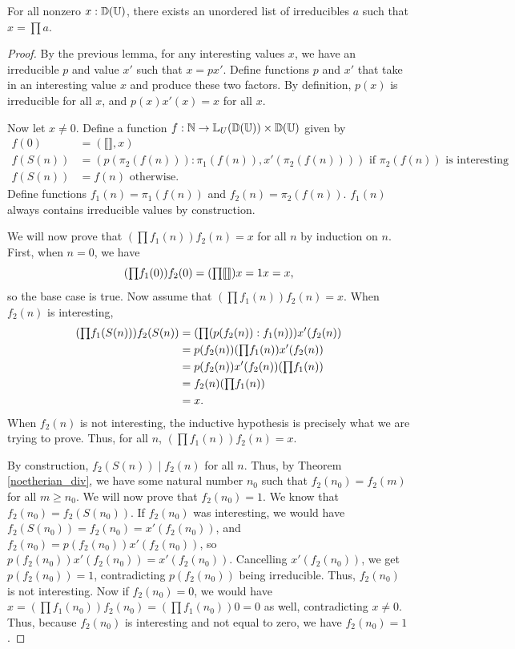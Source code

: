 \documentclass[../../math.tex]{subfiles}
\begin{document}
\begin{theorem} \label{noetherian_factors}
    For all nonzero $x : \mathbb{D}(\mathbb{U})$, there exists an unordered list of irreducibles
    $a$ such that $x = \prod a$.
\end{theorem}
\begin{proof}
    By the previous lemma, for any interesting values $x$, we have an
    irreducible $p$ and value $x'$ such that $x = px'$.  Define functions $p$
    and $x'$ that take in an interesting value $x$ and produce these two
    factors.  By definition, $p(x)$ is irreducible for all $x$, and $p(x)x'(x) =
    x$ for all $x$.

    Now let $x \neq 0$.  Define a function $f : \mathbb{N} \to \mathbb{L}_U(\mathbb{D}(\mathbb{U})) \times
    \mathbb{D}(\mathbb{U})$ given by
    \begin{align*}
        f(0) &= (\llbracket \rrbracket, x) \\
        f(S(n)) &= (p(\pi_2(f(n))) : \pi_1(f(n)), x'(\pi_2(f(n))))
            \text{ if $\pi_2(f(n))$ is interesting} \\
        f(S(n)) &= f(n) \text{ otherwise.}
    \end{align*}
    Define functions $f_1(n) = \pi_1(f(n))$ and $f_2(n) = \pi_2(f(n))$.
    $f_1(n)$ always contains irreducible values by construction.

    We will now prove that $(\prod f_1(n)) f_2(n) = x$ for all $n$ by induction
    on $n$.  First, when $n = 0$, we have
    \[
        ({\textstyle \prod} f_1(0)) f_2(0) = ({\textstyle \prod} \llbracket \rrbracket) x = 1x = x,
    \]
    so the base case is true.  Now assume that $(\prod f_1(n)) f_2(n) = x$.
    When $f_2(n)$ is interesting,
    \begin{align*}
        ({\textstyle \prod} f_1(S(n))) f_2(S(n))
        &= ({\textstyle \prod} (p(f_2(n)) : f_1(n))) x'(f_2(n)) \\
        &= p(f_2(n)) ({\textstyle \prod} f_1(n)) x'(f_2(n)) \\
        &= p(f_2(n)) x'(f_2(n)) ({\textstyle \prod} f_1(n)) \\
        &= f_2(n) ({\textstyle \prod} f_1(n)) \\
        &= x.
    \end{align*}
    When $f_2(n)$ is not interesting, the inductive hypothesis is precisely what
    we are trying to prove.  Thus, for all $n$, $(\prod f_1(n)) f_2(n) = x$.

    By construction, $f_2(S(n)) \mid f_2(n)$ for all $n$.  Thus, by Theorem
    \ref{noetherian_div}, we have some natural number $n_0$ such that $f_2(n_0)
    = f_2(m)$ for all $m \geq n_0$.  We will now prove that $f_2(n_0) = 1$.  We
    know that $f_2(n_0) = f_2(S(n_0))$.  If $f_2(n_0)$ was interesting, we would
    have $f_2(S(n_0)) = f_2(n_0) = x'(f_2(n_0))$, and $f_2(n_0) = p(f_2(n_0))
    x'(f_2(n_0))$, so $p(f_2(n_0)) x'(f_2(n_0)) = x'(f_2(n_0))$.  Cancelling
    $x'(f_2(n_0))$, we get $p(f_2(n_0)) = 1$, contradicting $p(f_2(n_0))$ being
    irreducible.  Thus, $f_2(n_0)$ is not interesting.  Now if $f_2(n_0) = 0$,
    we would have $x = (\prod f_1(n_0)) f_2(n_0) = (\prod f_1(n_0))0 = 0$ as
    well, contradicting $x \neq 0$.  Thus, because $f_2(n_0)$ is interesting and
    not equal to zero, we have $f_2(n_0) = 1$.


\end{proof}
\end{document}
